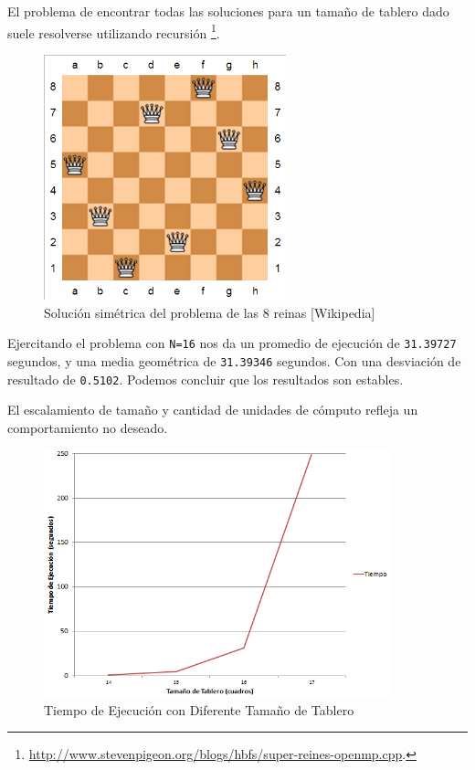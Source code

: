 \documentclass[a4paper]{report}
\begin{document}
\bigskip

El problema de encontrar todas las soluciones para un tamaño de tablero dado suele resolverse utilizando recursión \footnote{\href{http://www.stevenpigeon.org/blogs/hbfs/super-reines-openmp.cpp}{http://www.stevenpigeon.org/blogs/hbfs/super-reines-openmp.cpp}.}.

\begin{figure}[H]
\centering
\includegraphics[width=7cm]{queen.png}
\caption{Solución simétrica del problema de las 8 reinas [Wikipedia]}
\end{figure}

Ejercitando el problema con {\tt N=16} nos da un promedio de ejecución de {\tt 31.39727} segundos, y una media geométrica de {\tt 31.39346} segundos. Con una desviación de resultado de {\tt 0.5102}. Podemos concluir que los resultados son estables.

\bigskip

El escalamiento de tamaño y cantidad de unidades de cómputo refleja un comportamiento no deseado.

\begin{figure}[H]
\centering
\includegraphics[width=10cm]{queen-problem.png}
\caption{Tiempo de Ejecución con Diferente Tamaño de Tablero}
\label{fig:queen-problem}
\end{figure}
\end{document}
